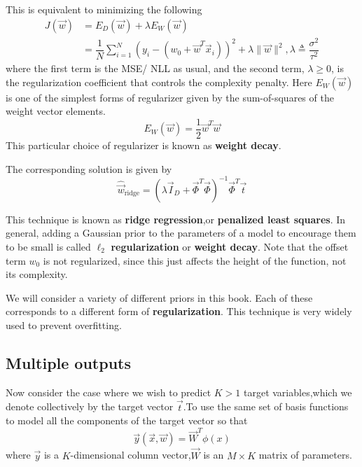This is equivalent to minimizing the following
\begin{align}\label{eqn:Ridge-regression-J}
J(\vec{w})&=E_D(\vec{w})+\lambda E_W(\vec{w}) \\
&=\dfrac{1}{N}\sum\limits_{i=1}^N (y_i-(w_0+\vec{w}^T\vec{x}_i))^2+\lambda\lVert\vec{w}\rVert^2 , \lambda \triangleq \dfrac{\sigma^2}{\tau^2}
\end{align}
where the first term is the MSE/ NLL as usual, and the second term, $\lambda \geq 0$, is the regularization coefficient that controls the complexity penalty.
Here $E_W(\vec{w})$ is one of the simplest forms of regularizer given by the sum-of-squares of the weight vector elements.
\begin{equation}
E_W(\vec{w})=\dfrac{1}{2}\vec{w}^T\vec{w}
\end{equation}
This particular choice of regularizer is known as \textbf{weight decay}.

The corresponding solution is given by
\begin{equation}\label{eqn:Ridge-regression-solution}
\hat{\vec{w}}_{\mathrm{ridge}}=(\lambda\vec{I}_D+\vec{\Phi}^T\vec{\Phi})^{-1}\vec{\Phi}^T\vec{t}
\end{equation}

This technique is known as \textbf{ridge regression},or \textbf{penalized least squares}. In general, adding a Gaussian prior to the parameters of a model to encourage them to be small is called $\ell_2$ \textbf{regularization} or \textbf{weight decay}. Note that the offset term $w_0$ is not regularized, since this just affects the height of the function, not its complexity.

We will consider a variety of different priors in this book. Each of these corresponds to a different form of \textbf{regularization}. This technique is very widely used to prevent overfitting.

\subsection{Multiple outputs}
Now consider the case where we wish to predict $K>1$ target variables,which we denote collectively by the target vector $\vec{t}$.To use the same set of basis functions to model all the components of the target vector so that
\begin{equation}
\vec{y}(\vec{x},\vec{w}) = \vec{W}^T\phi(x)
\end{equation}
where $\vec{y}$ is a $K$-dimensional column vector,$\vec{W}$ is an $M\times K$ matrix of parameters.

